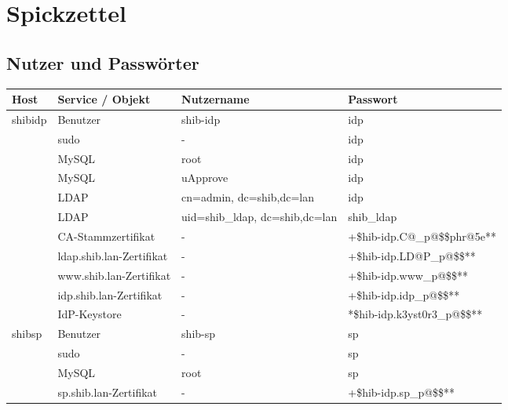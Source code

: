 \section{Spickzettel}\label{sec:spickzettel}
\subsection{Nutzer und Passwörter}

\begin{center}
	\begin{tabular}{| l | l | p{4cm} | l | }
		\hline
		Host & Service / Objekt & Nutzername & Passwort\\ \hline \hline
		\multirow{11}{*}{shibidp}
		 & Benutzer & shib-idp & idp \\ \cline{2-4}
		 & sudo & - & idp \\ \cline{2-4}
		 & MySQL & root & idp \\ \cline{2-4}
		 & MySQL & uApprove & idp \\ \cline{2-4}
		 & LDAP & cn=admin, dc=shib,dc=lan & idp \\ \cline{2-4}
		 & LDAP & uid=shib\_ldap, dc=shib,dc=lan & shib\_ldap \\ \cline{2-4}
		 & CA-Stammzertifikat & - & +\$hib-idp.C@\_p@\$\$phr@5e** \\ \cline{2-4}
		 & ldap.shib.lan-Zertifikat & - & +\$hib-idp.LD@P\_p@\$\$** \\ \cline{2-4}
		 & www.shib.lan-Zertifikat & - & +\$hib-idp.www\_p@\$\$** \\ \cline{2-4}
		 & idp.shib.lan-Zertifikat & - & +\$hib-idp.idp\_p@\$\$** \\ \cline{2-4}
		 & IdP-Keystore & - & *\$hib-idp.k3yst0r3\_p@\$\$** \\ \hline
		\hline
		\multirow{4}{*}{shibsp}
		 & Benutzer & shib-sp & sp \\ \cline{2-4}
		 & sudo & - & sp \\ \cline{2-4}
		 & MySQL & root & sp \\ \cline{2-4}
		 & sp.shib.lan-Zertifikat & - & +\$hib-idp.sp\_p@\$\$** \\ \hline
	\end{tabular}
\end{center}

